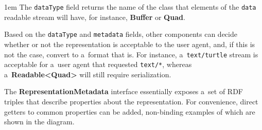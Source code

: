 \documentclass[10pt]{article}
\newcommand\component[1]{\mbox{\bf #1}}
\newcommand\field[1]{\mbox{\tt #1}}
\newenvironment{Note}
  {\begin{multicols}{3}%
     \parskip 1em}
  {\end{multicols}}
\begin{document}
\bigskip


\bigskip

\begin{Note}
The \field{dataType} field returns the name of the class
that elements of the \field{data} readable stream will have,
for instance,
\component{Buffer} or \component{Quad}.
\columnbreak

Based on the \field{dataType} and \field{metadata} fields,
other components can decide whether or not the representation
is acceptable to the user agent,
and, if this is not the case,
convert to a~format that is.
For instance,
a~\verb!text/turtle! stream is acceptable
for a~user agent that requested \verb!text/*!,
whereas a~\component{Readable<Quad>} will still require serialization.

\columnbreak
The \component{RepresentationMetadata} interface
essentially exposes a~set of RDF triples
that describe properties about the representation.
For convenience,
direct getters to common properties can be added,
non-binding examples of which are shown in the diagram.

\end{Note}
\end{document}
